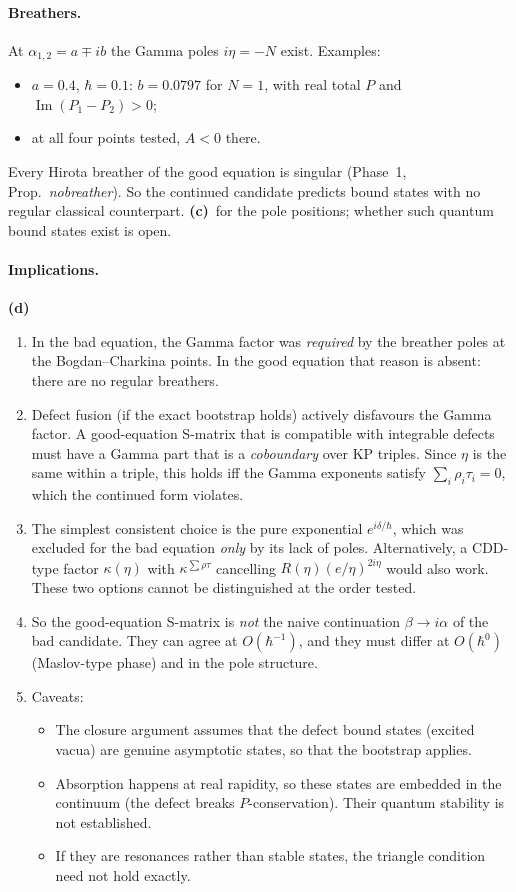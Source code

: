 \documentclass[11pt,a4paper]{article}
\newcommand{\Lc}{\textsf{\textbf{(c)}}}\newcommand{\Ld}{\textsf{\textbf{(d)}}}
\begin{document}
\paragraph{Breathers.} At $\alpha_{1,2}=a\mp ib$ the Gamma poles $i\eta=-N$ exist. Examples:
\begin{itemize}
\item $a=0.4$, $\hbar=0.1$: $b=0.0797$ for $N=1$, with real total $P$ and $\operatorname{Im}(P_1-P_2)>0$;
\item at all four points tested, $A<0$ there.
\end{itemize}
Every Hirota breather of the good equation is singular (Phase~1, Prop.~\emph{nobreather}). So the continued candidate predicts bound states with no regular classical counterpart. \Lc\ for the pole positions; whether such quantum bound states exist is open.

\paragraph{Implications.} \Ld
\begin{enumerate}
\item In the bad equation, the Gamma factor was \emph{required} by the breather poles at the Bogdan--Charkina points. In the good equation that reason is absent: there are no regular breathers.
\item Defect fusion (if the exact bootstrap holds) actively disfavours the Gamma factor. A good-equation S-matrix that is compatible with integrable defects must have a Gamma part that is a \emph{coboundary} over KP triples. Since $\eta$ is the same within a triple, this holds iff the Gamma exponents satisfy $\sum_i\rho_i\tau_i=0$, which the continued form violates.
\item The simplest consistent choice is the pure exponential $e^{i\delta/\hbar}$, which was excluded for the bad equation \emph{only} by its lack of poles. Alternatively, a CDD-type factor $\kappa(\eta)$ with $\kappa^{\sum\rho\tau}$ cancelling $R(\eta)(e/\eta)^{2i\eta}$ would also work. These two options cannot be distinguished at the order tested.
\item So the good-equation S-matrix is \emph{not} the naive continuation $\beta\to i\alpha$ of the bad candidate. They can agree at $O(\hbar^{-1})$, and they must differ at $O(\hbar^0)$ (Maslov-type phase) and in the pole structure.
\item Caveats:
  \begin{itemize}
  \item The closure argument assumes that the defect bound states (excited vacua) are genuine asymptotic states, so that the bootstrap applies.
  \item Absorption happens at real rapidity, so these states are embedded in the continuum (the defect breaks $P$-conservation). Their quantum stability is not established.
  \item If they are resonances rather than stable states, the triangle condition need not hold exactly.
  \end{itemize}
\end{enumerate}
\end{document}
